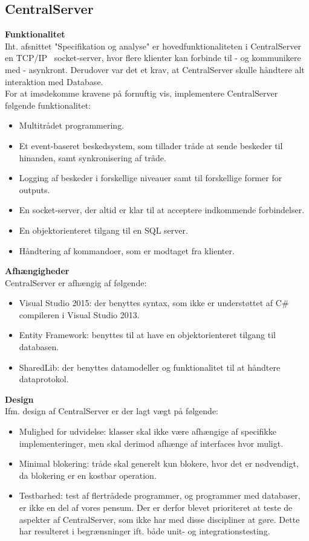 \subsection{CentralServer}

\textbf{Funktionalitet}\\
Iht. afsnittet "Specifikation og analyse" er hovedfunktionaliteten i CentralServer en TCP/IP~\cite{TCPIP} socket-server, hvor flere klienter kan forbinde til - og kommunikere med - asynkront. Derudover var det et krav, at CentralServer skulle håndtere alt interaktion med Database.\\

For at imødekomme kravene på fornuftig vis, implementere CentralServer følgende funktionalitet:

\begin{itemize}
	\item Multitrådet programmering.
	\item Et event-baseret beskedsystem, som tillader tråde at sende beskeder til hinanden, samt synkronisering af tråde.
	\item Logging af beskeder i forskellige niveauer samt til forskellige former for outputs.
	\item En socket-server, der altid er klar til at acceptere indkommende forbindelser.
	\item En objektorienteret tilgang til en SQL server.
	\item Håndtering af kommandoer, som er modtaget fra klienter.
\end{itemize}


\textbf{Afhængigheder}\\
CentralServer er afhængig af følgende:

\begin{itemize}
	\item Visual Studio 2015: der benyttes syntax, som ikke er understøttet af C\# compileren i Visual Studio 2013.
	\item Entity Framework: benyttes til at have en objektorienteret tilgang til databasen.
	\item SharedLib: der benyttes datamodeller og funktionalitet til at håndtere dataprotokol.
\end{itemize}


\textbf{Design}\\
Ifm. design af CentralServer er der lagt vægt på følgende:

\begin{itemize}
	\item Mulighed for udvidelse: klasser skal ikke være afhængige af specifikke implementeringer, men skal derimod afhænge af interfaces hvor muligt.
	\item Minimal blokering: tråde skal generelt kun blokere, hvor det er nødvendigt, da blokering er en kostbar operation.
	\item Testbarhed: test af flertrådede programmer, og programmer med databaser, er ikke en del af vores pensum. Der er derfor blevet prioriteret at teste de aspekter af CentralServer, som ikke har med disse discipliner at gøre. Dette har resulteret i begrænsninger ift. både unit- og integrationstesting.
\end{itemize}

